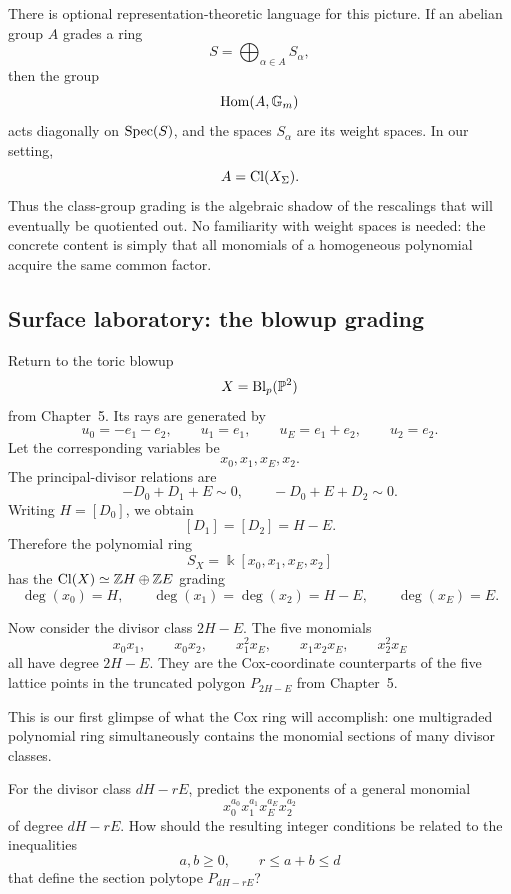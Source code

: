 \begin{observation}
There is optional representation-theoretic language for this picture.
If an abelian group \(A\) grades a ring
\[
S=\bigoplus_{\alpha\in A}S_\alpha,
\]
then the group
\[
\Hom(A,\Gm)
\]
acts diagonally on \(\Spec(S)\), and the spaces \(S_\alpha\) are its
weight spaces. In our setting,
\[
A=\Cl(X_\Sigma).
\]
Thus the class-group grading is the algebraic shadow of the rescalings
that will eventually be quotiented out. No familiarity with weight
spaces is needed: the concrete content is simply that all monomials of
a homogeneous polynomial acquire the same common factor.
\end{observation}

\subsection{Surface laboratory: the blowup grading}

Return to the toric blowup
\[
X=\Blp{\PP^2}{p}
\]
from Chapter~5. Its rays are generated by
\[
u_0=-e_1-e_2,
\qquad
u_1=e_1,
\qquad
u_E=e_1+e_2,
\qquad
u_2=e_2.
\]
Let the corresponding variables be
\[
x_0,x_1,x_E,x_2.
\]
The principal-divisor relations are
\[
-D_0+D_1+E\sim0,
\qquad
-D_0+E+D_2\sim0.
\]
Writing \(H=[D_0]\), we obtain
\[
[D_1]=[D_2]=H-E.
\]
Therefore the polynomial ring
\[
S_X=\Bbbk[x_0,x_1,x_E,x_2]
\]
has the \(\Cl(X)\simeq\ZZ H\oplus\ZZ E\) grading
\[
\deg(x_0)=H,
\qquad
\deg(x_1)=\deg(x_2)=H-E,
\qquad
\deg(x_E)=E.
\]

Now consider the divisor class \(2H-E\). The five monomials
\[
x_0x_1,
\qquad
x_0x_2,
\qquad
x_1^2x_E,
\qquad
x_1x_2x_E,
\qquad
x_2^2x_E
\]
all have degree \(2H-E\). They are the Cox-coordinate counterparts of
the five lattice points in the truncated polygon \(P_{2H-E}\) from
Chapter~5.

This is our first glimpse of what the Cox ring will accomplish: one
multigraded polynomial ring simultaneously contains the monomial
sections of many divisor classes.

\begin{prediction}
For the divisor class \(dH-rE\), predict the exponents of a general
monomial
\[
x_0^{a_0}x_1^{a_1}x_E^{a_E}x_2^{a_2}
\]
of degree \(dH-rE\). How should the resulting integer conditions be
related to the inequalities
\[
a,b\geq0,
\qquad
r\leq a+b\leq d
\]
that define the section polytope \(P_{dH-rE}\)?
\end{prediction}


